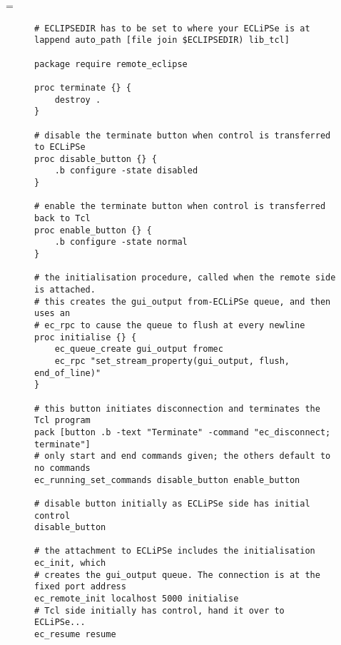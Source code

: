 \documentclass[11pt,a4paper]{book}
\makeatletter
\let\realnormalsize=\normalsize
\def\preveqno{}\let\real@float=\@float \let\realend@float=\end@float
\def\@float{\let\@savefreelist\@freelist\real@float}
\def\end@float{\realend@float\global\let\@freelist\@savefreelist}
\def\adjustnormalsize{\def\normalsize{\mathsurround=0pt \realnormalsize
 \parindent=0pt\abovedisplayskip=0pt\belowdisplayskip=0pt}\normalsize}%
\def\lthtmltypeout#1{{\let\protect\string\immediate\write\lthtmlwrite{#1}}}%
\newcommand\lthtmlvboxmathA{\adjustnormalsize\setbox\sizebox=\vbox\bgroup %
 \let\ifinner=\iffalse }%
\newcommand\lthtmlboxmathZ{\@next\next\@currlist{}{\def\next{\voidb@x}}%
 \expandafter\box\next\egroup}%
\newcommand\lthtmlmathtype[1]{\def\lthtmlmathenv{#1}}%
\newcommand\lthtmllogmath{\lthtmltypeout{l2hSize %
:\lthtmlmathenv:\the\ht\sizebox::\the\dp\sizebox::\the\wd\sizebox.\preveqno}}%
\newcommand\lthtmlfigureA[1]{\let\@savefreelist\@freelist
       \lthtmlmathtype{#1}\lthtmlvboxmathA}%
\newcommand\lthtmlfigureZ{\lthtmlboxmathZ\lthtmllogmath\copy\sizebox
       \global\let\@freelist\@savefreelist}%
\def\lthtmlcheckvsize{\ifdim\ht\sizebox<\vsize 
  \ifdim\wd\sizebox<\hsize\expandafter\hfill\fi \expandafter\vfill
  \else\expandafter\vss\fi}%
\makeatother
\begin{document}
{\newpage\clearpage
\lthtmlfigureA{figure2419}%
\begin{figure}
{\small\begin{verbatim}# ECLIPSEDIR has to be set to where your ECLiPSe is at
lappend auto_path [file join $ECLIPSEDIR) lib_tcl]

package require remote_eclipse 

proc terminate {} {
    destroy .
}

# disable the terminate button when control is transferred to ECLiPSe
proc disable_button {} {
    .b configure -state disabled
}

# enable the terminate button when control is transferred back to Tcl
proc enable_button {} {
    .b configure -state normal
}

# the initialisation procedure, called when the remote side is attached. 
# this creates the gui_output from-ECLiPSe queue, and then uses an
# ec_rpc to cause the queue to flush at every newline
proc initialise {} {
	ec_queue_create gui_output fromec
	ec_rpc "set_stream_property(gui_output, flush, end_of_line)"
}

# this button initiates disconnection and terminates the Tcl program
pack [button .b -text "Terminate" -command "ec_disconnect; terminate"] 
# only start and end commands given; the others default to no commands
ec_running_set_commands disable_button enable_button

# disable button initially as ECLiPSe side has initial control
disable_button  

# the attachment to ECLiPSe includes the initialisation ec_init, which
# creates the gui_output queue. The connection is at the fixed port address
ec_remote_init localhost 5000 initialise
# Tcl side initially has control, hand it over to ECLiPSe...
ec_resume resume\end{verbatim}}
\end{figure}%
\lthtmlfigureZ
\lthtmlcheckvsize\clearpage}


\providecommand{\jarlocation}{{\tt /lib/eclipse.jar}}%


\providecommand{\docslocation}{{\tt /doc/javadoc/JavaEclipseInterface/index.html}}%


\providecommand{\exampleslocation}{{\tt /doc/examples/JavaInterface}}%
\end{document}
